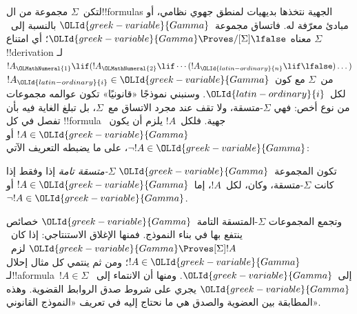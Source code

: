 \documentclass[../../../include/open-logic-section]{subfiles}
\begin{document}


لتكن~$\Sigma$ مجموعة من ال!!{formula}s الجهية نتخذها بديهيات
لمنطق جهوي نظامي، أو مبادئ معرّفة له. فاتساق مجموعة~${\OLId{greek-variable}{Gamma}}$
بالنسبة إلى~$\Sigma$ معناه ${\OLId{greek-variable}{Gamma}} \Proves/[\Sigma] \lfalse$؛
أي امتناع !!{derivation} لـ
$!A_{\OLMathNumeral{1}} \lif (!A_{\OLMathNumeral{2}} \lif \cdots (!A_{\OLId{latin-ordinary}{n}} \lif \lfalse)\dots)$ من~$\Sigma$
مع كون~$!A_{\OLId{latin-ordinary}{i}} \in {\OLId{greek-variable}{Gamma}}$ لكل~${\OLId{latin-ordinary}{i}}$.
وسنبني نموذجًا «قانونيًا» تكون عوالمه مجموعات من نوع أخص:
فهي $\Sigma$-متسقة، ولا تقف عند مجرد الاتساق مع~$\Sigma$،
بل تبلغ الغاية فيه بأن تفصل في كل !!{formula} جهية.
فلكل~$!A$ يلزم أن يكون~$!A \in {\OLId{greek-variable}{Gamma}}$ أو $\lnot !A \in {\OLId{greek-variable}{Gamma}}$،
على ما يضبطه التعريف الآتي:

\begin{defn}
  تكون المجموعة~${\OLId{greek-variable}{Gamma}}$ \emph{$\Sigma$-متسقة تامة} إذا وفقط إذا
  كانت $\Sigma$-متسقة، وكان، لكل~$!A$، إما~$!A \in {\OLId{greek-variable}{Gamma}}$ أو
  $\lnot !A \in {\OLId{greek-variable}{Gamma}}$.
\end{defn}

وتجمع المجموعات $\Sigma$-المتسقة التامة~${\OLId{greek-variable}{Gamma}}$ خصائص ينتفع بها
في بناء النموذج. فمنها الإغلاق الاستنتاجي:
إذا كان~${\OLId{greek-variable}{Gamma}} \Proves[\Sigma] !A$ لزم~$!A \in {\OLId{greek-variable}{Gamma}}$؛
ومن ثم ينتمي كل مثال إحلال لـ!!a{formula}~$!A \in \Sigma$ إلى~${\OLId{greek-variable}{Gamma}}$.
ومنها أن الانتماء إلى~${\OLId{greek-variable}{Gamma}}$ يجري على شروط صدق الروابط القضوية.
وهذه المطابقة بين العضوية والصدق هي ما نحتاج إليه في تعريف
«النموذج القانوني».
\end{document}
